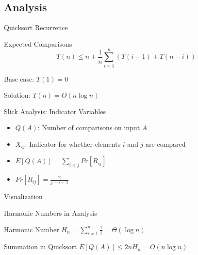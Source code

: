 \subsection{Analysis}
\begin{frame}{Quicksort Recurrence}
  \begin{block}{Expected Comparisons}
    \[
      T(n) \leq n + \frac{1}{n} \sum_{i=1}^n (T(i-1) + T(n-i))
    \]

    Base case: $T(1) = 0$

    Solution: $T(n) = O(n \log n)$
  \end{block}
\end{frame}

\begin{frame}{Slick Analysis: Indicator Variables}
  \begin{itemize}
    \item $Q(A)$: Number of comparisons on input $A$

    \item $X_{ij}$: Indicator for whether elements $i$ and $j$ are compared

    \item $E[Q(A)] = \sum_{i<j} Pr[R_{ij}]$

    \item $Pr[R_{ij}] = \frac{2}{j-i+1}$
  \end{itemize}

  \begin{block}{Visualization}
    \begin{center}
    \end{center}
  \end{block}
\end{frame}

\begin{frame}{Harmonic Numbers in Analysis}
  \begin{block}{Harmonic Number}
    $H_n = \sum_{i=1}^n \frac{1}{i} = \Theta(\log n)$
  \end{block}

  \begin{block}{Summation in Quicksort}
    $E[Q(A)] \leq 2nH_n = O(n \log n)$
  \end{block}
\end{frame}